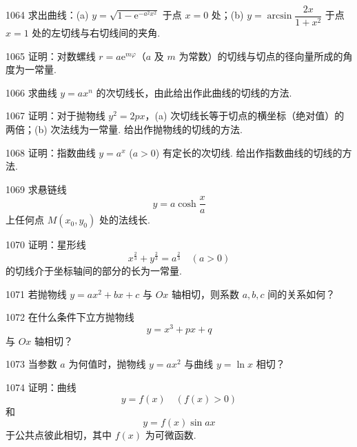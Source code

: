 \begin{prob}[M]{1064}
求出曲线：(a) $y = \sqrt{1 - \mathrm{e}^{-a^2 x^2}}$ 于点 $x = 0$ 处；(b) $y = \arcsin \dfrac{2x}{1 + x^2}$ 于点 $x = 1$ 处的左切线与右切线间的夹角.
\end{prob}

\begin{prob}[M]{1065}
证明：对数螺线 $r = a\mathrm{e}^{m\varphi}$（$a$ 及 $m$ 为常数）的切线与切点的径向量所成的角度为一常量.
\end{prob}

\begin{prob}[M]{1066}
求曲线 $y = ax^n$ 的次切线长，由此给出作此曲线的切线的方法.
\end{prob}

\begin{prob}[M]{1067}
证明：对于抛物线 $y^2 = 2px$，(a) 次切线长等于切点的横坐标（绝对值）的两倍；(b) 次法线为一常量. 给出作抛物线的切线的方法.
\end{prob}

\begin{prob}[M]{1068}
证明：指数曲线 $y = a^x$ ($a > 0$) 有定长的次切线. 给出作指数曲线的切线的方法.
\end{prob}

\begin{prob}[M]{1069}
求悬链线
\[
y = a\cosh \frac{x}{a}
\]
上任何点 $M(x_0, y_0)$ 处的法线长.
\end{prob}

\begin{prob}[M]{1070}
证明：星形线
\[
x^{\frac{2}{3}} + y^{\frac{2}{3}} = a^{\frac{2}{3}} \quad (a > 0)
\]
的切线介于坐标轴间的部分的长为一常量.
\end{prob}

\begin{prob}[S]{1071}
若抛物线 $y = ax^2 + bx + c$ 与 $Ox$ 轴相切，则系数 $a, b, c$ 间的关系如何？
\end{prob}

\begin{prob}[M]{1072}
在什么条件下立方抛物线
\[
y = x^3 + px + q
\]
与 $Ox$ 轴相切？
\end{prob}

\begin{prob}[S]{1073}
当参数 $a$ 为何值时，抛物线 $y = ax^2$ 与曲线 $y = \ln x$ 相切？
\end{prob}

\begin{prob}[M]{1074}
证明：曲线
\[
y = f(x) \quad (f(x) > 0)
\]
和
\[
y = f(x)\sin ax
\]
于公共点彼此相切，其中 $f(x)$ 为可微函数.
\end{prob}

